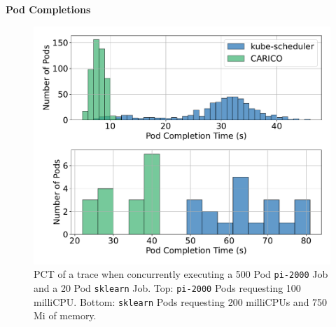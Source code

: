 \textbf{Pod Completions}\\
\begin{figure}[ht!]
    \centering
    \includegraphics[width=\textwidth]{images/mixed-pod-completion.pdf}
    \caption{PCT of a trace when concurrently executing a 500 Pod
    \texttt{pi-2000} Job and a 20 Pod \texttt{sklearn} Job. Top:
    \texttt{pi-2000} Pods requesting 100 milliCPU. Bottom: \texttt{sklearn} Pods
    requesting 200 milliCPUs and 750 Mi of memory.}
    \label{fig:mixed-pod-completion}
\end{figure}

